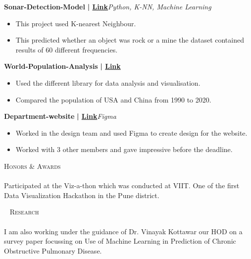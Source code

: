 \documentclass[a4paper]{article}
\newcommand{\lineunder} {
    \vspace*{-8pt} \\
    \hspace*{-18pt} \hrulefill \\
}
\newcommand{\header} [1] {
    {\hspace*{-18pt}\vspace*{6pt} \textsc{#1}}
    \vspace*{-6pt} \lineunder
}
\begin{document}
          \vspace*{3mm}
      {\textbf{Sonar-Detection-Model}}\textbf{ | \href{https://github.com/sayampalrecha/sonar-detection-project}{Link}}\hfill{\sl Python, K-NN, Machine Learning}\\
          \vspace{-3mm}
\begin{itemize} \itemsep -3pt
\item This project used K-nearest Neighbour.
\item  This predicted whether an object was rock or a mine the dataset contained result\textquotesingle{}s of 60 different frequencies.
\end{itemize}
          \vspace*{3mm}
      {\textbf{World-Population-Analysis}}\textbf{ | \href{}{Link}}\\
          \vspace{-3mm}
\begin{itemize} \itemsep -3pt
\item  Used the different library for data analysis and visualisation.
\item  Compared the population of USA and China from 1990 to 2020.
\end{itemize}
          \vspace*{3mm}
      {\textbf{Department-website}}\textbf{ | \href{https://isa-website-puce.vercel.app/}{Link}}\hfill{\sl Figma}\\
          \vspace{-3mm}
\begin{itemize} \itemsep -3pt
\item  Worked in the design team and used Figma to create design for the website.
\item  Worked with 3 other members and gave impressive before the deadline.
\end{itemize}
          \vspace*{3mm}



\header{Honors \& Awards}
      \vspace{2mm} 
      Participated at the Viz-a-thon which was conducted at VIIT. One of the first Data Visualization Hackathon in the Pune district.\\
\vspace*{1mm}

    \ 
    \header{ Research\Experience}
    \vspace{2mm} 
    I am also working under the guidance of Dr. Vinayak Kottawar our HOD on a survey paper focussing on Use of Machine Learning in Prediction of Chronic Obstructive Pulmonary Disease.\\
\vspace*{1mm}

  \ 
    
\end{document}
